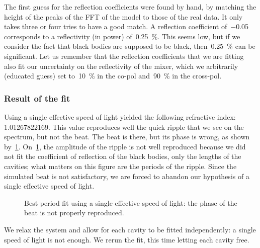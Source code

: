 The first guess for the reflection coefficients were found by hand, by matching the height of the peaks of the FFT of the model to those of the real data.
It only takes three or four tries to have a good match.
A reflection coefficient of~\num{-0.05} corresponds to a reflectivity (in power) of~\SI{0.25}{\percent}.
This seems low, but if we consider the fact that black bodies are supposed to be black, then~\SI{0.25}{\percent} can be significant.
Let us remember that the reflection coefficients that we are fitting also fit our uncertainty on the reflectivity of the mixer, which we arbitrarily (educated guess) set to~\SI{10}{\percent} in the co-pol and~\SI{90}{\percent} in the cross-pol.

\subsubsection{Result of the fit}

Using a single effective speed of light yielded the following refractive index: 1.01267822169.
This value reproduces well the quick ripple that we see on the spectrum, but not the beat.
The beat is there, but its phase is wrong, as shown by~\cref{fig:result_single_c}.
On~\cref{fig:result_single_c}, the amplitude of the ripple is not well reproduced because we did not fit the coefficient of reflection of the black bodies, only the lengths of the cavities; what matters on this figure are the periods of the ripple.
Since the simulated beat is not satisfactory, we are forced to abandon our hypothesis of a single effective speed of light.

\begin{figure}
    \centering
    \caption{Best period fit using a single effective speed of light: the phase of the beat is not properly reproduced.}
    \label{fig:result_single_c}
\end{figure}

We relax the system and allow for each cavity to be fitted independently: a single speed of light is not enough.
We rerun the fit, this time letting each cavity free.


